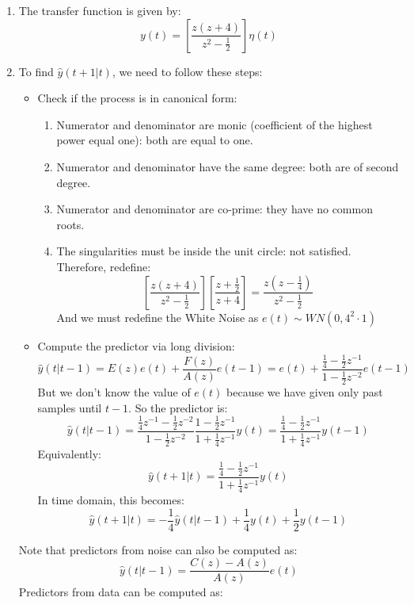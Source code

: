 \begin{enumerate}
    \item The transfer function is given by:
        \[y(t)=\left[\dfrac{z(z+4)}{z^2-\frac{1}{2}}\right]\eta(t)\]
    \item To find $\hat{y}(t+1|t)$, we need to follow these steps:
        \begin{itemize}
            \item Check if the process is in canonical form:
                \begin{enumerate}
                    \item Numerator and denominator are monic (coefficient of the highest power equal one): both are equal to one.
                    \item Numerator and denominator have the same degree: both are of second degree.
                    \item Numerator and denominator are co-prime: they have no common roots.
                    \item The singularities must be inside the unit circle: not satisfied. 
                        Therefore, redefine: 
                        \[\left[\dfrac{z(z+4)}{z^2-\frac{1}{2}}\right]\left[\dfrac{z+\frac{1}{2}}{z+4}\right]=\dfrac{z\left(z-\frac{1}{4}\right)}{z^{2}-\frac{1}{2}}\]
                        And we must redefine the White Noise as $e(t)\sim WN(0,4^2\cdot 1)$
                \end{enumerate}
            \item Compute the predictor via long division:
                \[\hat{y}(t|t-1)=E(z)e(t)+\dfrac{F(z)}{A(z)}e(t-1)=e(t)+\dfrac{\frac{1}{4}-\frac{1}{2}z^{-1}}{1-\frac{1}{2}z^{-2}}e(t-1)\]
                But we don't know the value of $e(t)$ because we have given only past samples until $t-1$.
                So the predictor is: 
                \[\hat{y}(t|t-1)=\dfrac{\frac{1}{4}z^{-1}-\frac{1}{2}z^{-2}}{1-\frac{1}{2}z^{-2}}\dfrac{1-\frac{1}{2}z^{-1}}{1+\frac{1}{4}z^{-1}}y(t)=\dfrac{\frac{1}{4}-\frac{1}{2}z^{-1}}{1+\frac{1}{4}z^{-1}}y(t-1)\]
                Equivalently: 
                \[\hat{y}(t+1|t)=\dfrac{\frac{1}{4}-\frac{1}{2}z^{-1}}{1+\frac{1}{4}z^{-1}}y(t)\]
                In time domain, this becomes:
                \[\hat{y}(t+1|t)=-\dfrac{1}{4}\hat{y}(t|t-1)+\dfrac{1}{4}y(t)+\dfrac{1}{2}y(t-1)\]
        \end{itemize}
        Note that predictors from noise can also be computed as:
        \[\hat{y}(t|t-1)=\dfrac{C(z)-A(z)}{A(z)}e(t)\]
        Predictors from data can be computed as:

\end{enumerate}
